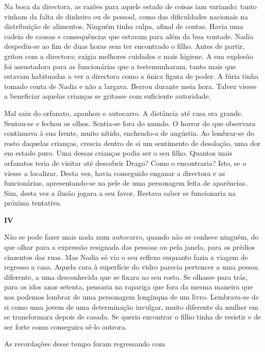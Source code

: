 Na boca da directora, as razões para aquele estado de
coisas iam variando: tanto vinham da falta de dinheiro ou
de pessoal, como das dificuldades nacionais na distribuição de
alimentos. Ninguém tinha culpa, afinal de contas. Havia uma cadeia de
causas e consequências que estavam para além da boa vontade. Nadia
despediu-se ao fim de duas horas sem ter encontrado o filho. Antes de
partir, gritou com a directora: exigia melhores cuidados e mais higiene.
A sua explosão foi assustadora para as funcionárias que a
testemunharam, tanto mais que estavam habituadas a ver a directora
como a única figura de poder. A fúria tinha tomado conta de Nadia e não
a largava. Berrou durante meia hora. Talvez viesse a beneficiar aquelas crianças se gritasse com suficiente autoridade.

Mal saiu do orfanato, apanhou o autocarro. A distância até casa era
grande. Sentou-se e fechou os olhos. Sentia-se fora do mundo. O horror
do que observara continuava à sua frente, muito nítido, enchendo-a de
angústia. Ao lembrar-se do rosto daquelas crianças, crescia dentro de si
um sentimento de desolação, uma dor em estado puro. Uma dessas crianças
podia ser o seu filho. Quantos mais orfanatos teria de visitar até
descobrir Drago? Como o encontraria? Isto, se o viesse a localizar.
Desta vez, havia conseguido enganar a directora e as funcionárias,
apresentando-se na pele de uma personagem feita de aparências. Sim,
desta vez a ilusão jogara a seu favor. Restava saber se funcionaria na
próxima tentativa.

\pagebreak
\vspace*{1.8cm}
\noindent{}\textbf{IV}

\bigskip

Não se pode fazer mais nada num autocarro, quando não se conhece
ninguém, do que olhar para a expressão resignada das pessoas ou pela
janela, para os prédios cinzentos das ruas. Mas Nadia só via o seu
reflexo enquanto fazia a viagem de regresso a casa. Aquela cara à
superfície do vidro parecia pertencer a uma pessoa diferente, a uma
desconhecida que se fixara ao seu rosto. Se olhasse para trás, para os
idos anos setenta, pensaria na rapariga que fora da mesma maneira que
nos podemos lembrar de uma personagem longínqua de um livro. Lembrava-se
de si como uma jovem de uma determinação invulgar, muito diferente da
mulher em se transformara depois de casada. Se queria encontrar o filho
tinha de resistir e de ser forte como conseguira sê-lo outrora.

As recordações desse tempo foram regressando com

